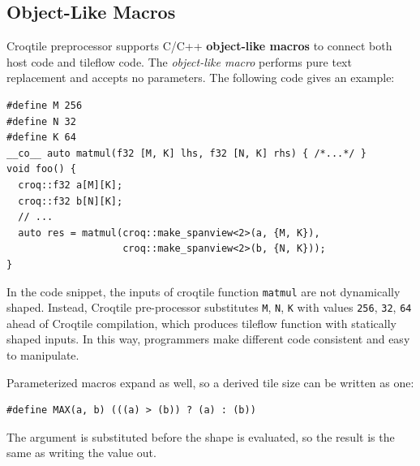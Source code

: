 \subsection*{Object-Like Macros}

Croqtile preprocessor supports C/C++ \textbf{object-like macros} to connect both host code and tileflow code. The \emph{object-like macro} performs pure text replacement and accepts no parameters. The following code gives an example:

\begin{lstlisting}[language=croqtile,caption={An object-like macro}]
#define M 256
#define N 32
#define K 64
__co__ auto matmul(f32 [M, K] lhs, f32 [N, K] rhs) { /*...*/ }
void foo() {
  croq::f32 a[M][K];
  croq::f32 b[N][K];
  // ...
  auto res = matmul(croq::make_spanview<2>(a, {M, K}),
                    croq::make_spanview<2>(b, {N, K}));
}
\end{lstlisting}

In the code snippet, the inputs of croqtile function \texttt{matmul} are not dynamically shaped. Instead, Croqtile pre-processor substitutes \texttt{M}, \texttt{N}, \texttt{K} with values \texttt{256}, \texttt{32}, \texttt{64} ahead of Croqtile compilation, which produces tileflow function with statically shaped inputs. In this way, programmers make different code consistent and easy to manipulate.

Parameterized macros expand as well, so a derived tile size can be written as one:

\begin{lstlisting}[language={},caption={A macro with parameters}]
#define MAX(a, b) (((a) > (b)) ? (a) : (b))
\end{lstlisting}

The argument is substituted before the shape is evaluated, so the result is the same as writing the value out.
